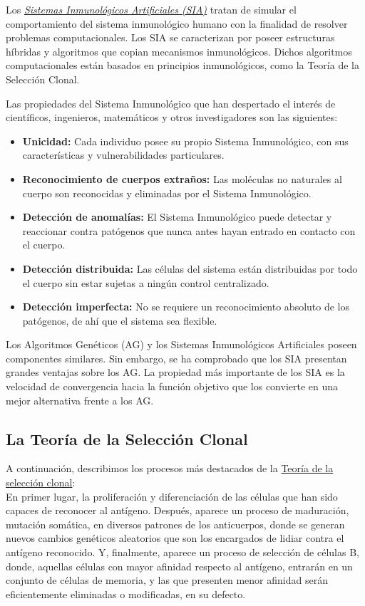 \documentclass[10pt,a4paper]{article}
\begin{document}
	Los \underline{\textit{Sistemas Inmunológicos Artificiales (SIA)}} tratan de simular el comportamiento del sistema inmunológico humano con la finalidad de resolver problemas computacionales. Los SIA se caracterizan por poseer estructuras híbridas y algoritmos que copian mecanismos inmunológicos. Dichos algoritmos computacionales están basados en principios inmunológicos, como la Teoría de la Selección Clonal.
	
	Las propiedades del Sistema Inmunológico que han despertado
	el interés de científicos, ingenieros, matemáticos y otros investigadores son las siguientes:
	
	\begin{itemize}
		\item \textbf{Unicidad:} Cada individuo posee su propio Sistema Inmunológico, con sus
		características y vulnerabilidades particulares.
		
		\item \textbf{Reconocimiento de cuerpos extraños:} Las moléculas no naturales al cuerpo
		son reconocidas y eliminadas por el Sistema Inmunológico.
		
		\item \textbf{Detección de anomalías:} El Sistema Inmunológico puede detectar y
		reaccionar contra patógenos que nunca antes hayan entrado en contacto con
		el cuerpo.
		
		\item \textbf{Detección distribuida:} Las células del sistema están distribuidas por todo el
		cuerpo sin estar sujetas a ningún control centralizado.
		
		\item \textbf{Detección imperfecta:} No se requiere un reconocimiento absoluto de los
		patógenos, de ahí que el sistema sea flexible.
	\end{itemize}

	Los Algoritmos Genéticos (AG) y los Sistemas Inmunológicos Artificiales poseen
	componentes similares. Sin embargo, se ha comprobado que los SIA presentan grandes
	ventajas sobre los AG. La propiedad más importante de los SIA es la velocidad de convergencia hacia la función objetivo que los convierte en una mejor alternativa frente a los AG.
	
	\subsection{La Teoría de la Selección Clonal}
	
	A continuación, describimos los procesos más destacados de la \underline{Teoría de la selección clonal}:\\
	En primer lugar, la proliferación y diferenciación de las células que han
	sido capaces de reconocer al antígeno. Después, aparece un proceso de
	maduración, mutación somática, en diversos patrones de los anticuerpos, donde se
	generan nuevos cambios genéticos aleatorios que son los encargados de lidiar
	contra el antígeno reconocido. Y, finalmente, aparece un proceso de selección de
	células B, donde, aquellas células con mayor afinidad respecto al antígeno, entrarán
	en un conjunto de células de memoria, y las que presenten menor afinidad serán
	eficientemente eliminadas o modificadas, en su defecto.
	
\end{document}
